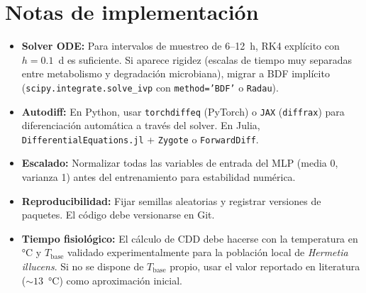 \section{Notas de implementación}

\begin{itemize}
    \item \textbf{Solver ODE:} Para intervalos de muestreo de 6--12~h, RK4 explícito con $h=0.1$~d es suficiente. Si aparece rigidez (escalas de tiempo muy separadas entre metabolismo y degradación microbiana), migrar a BDF implícito (\texttt{scipy.integrate.solve\_ivp} con \texttt{method='BDF'} o \texttt{Radau}).
    
    \item \textbf{Autodiff:} En Python, usar \texttt{torchdiffeq} (PyTorch) o \texttt{JAX} (\texttt{diffrax}) para diferenciación automática a través del solver. En Julia, \texttt{DifferentialEquations.jl} + \texttt{Zygote} o \texttt{ForwardDiff}.
    
    \item \textbf{Escalado:} Normalizar todas las variables de entrada del MLP (media 0, varianza 1) antes del entrenamiento para estabilidad numérica.
    
    \item \textbf{Reproducibilidad:} Fijar semillas aleatorias y registrar versiones de paquetes. El código debe versionarse en Git.
    
    \item \textbf{Tiempo fisiológico:} El cálculo de CDD debe hacerse con la temperatura en °C y $T_{\text{base}}$ validado experimentalmente para la población local de \textit{Hermetia illucens}. Si no se dispone de $T_{\text{base}}$ propio, usar el valor reportado en literatura ($\sim 13$~°C) como aproximación inicial.
\end{itemize}
